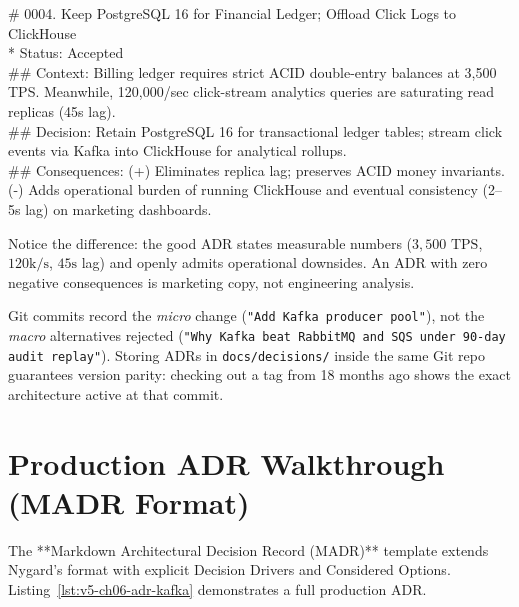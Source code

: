 \begin{tcolorbox}[colback=intuitionBg, colframe=intuitionTeal, boxrule=0pt, leftrule=3pt, title={\sffamily\bfseries\small Good ADR Excerpt (Quantitative, Honest Trade-Offs)}, coltitle=intuitionTeal]
\small\ttfamily
\# 0004. Keep PostgreSQL 16 for Financial Ledger; Offload Click Logs to ClickHouse\\
* Status: Accepted\\
\#\# Context: Billing ledger requires strict ACID double-entry balances at 3,500 TPS. Meanwhile, 120,000/sec click-stream analytics queries are saturating read replicas (45s lag).\\
\#\# Decision: Retain PostgreSQL 16 for transactional ledger tables; stream click events via Kafka into ClickHouse for analytical rollups.\\
\#\# Consequences: (+) Eliminates replica lag; preserves ACID money invariants. (-) Adds operational burden of running ClickHouse and eventual consistency (2--5s lag) on marketing dashboards.
\end{tcolorbox}

Notice the difference: the good ADR states measurable numbers ($3,500\text{ TPS}$, $120\text{k/s}$, $45\text{s}$ lag) and openly admits operational downsides. An ADR with zero negative consequences is marketing copy, not engineering analysis.

\begin{underthehoodbox}
Git commits record the \emph{micro} change (\texttt{"Add Kafka producer pool"}), not the \emph{macro} alternatives rejected (\texttt{"Why Kafka beat RabbitMQ and SQS under 90-day audit replay"}). Storing ADRs in \texttt{docs/decisions/} inside the same Git repo guarantees version parity: checking out a tag from 18 months ago shows the exact architecture active at that commit.
\end{underthehoodbox}

\section{Production ADR Walkthrough (MADR Format)}

The **Markdown Architectural Decision Record (MADR)** template extends Nygard's format with explicit Decision Drivers and Considered Options. Listing~\ref{lst:v5-ch06-adr-kafka} demonstrates a full production ADR.

